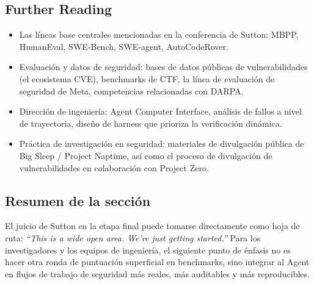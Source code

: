 \documentclass[a4paper]{article}
\begin{document}
\subsection{Further Reading}
\begin{itemize}
    \item Las líneas base centrales mencionadas en la conferencia de Sutton: MBPP, HumanEval, SWE-Bench, SWE-agent, AutoCodeRover.
    \item Evaluación y datos de seguridad: bases de datos públicas de vulnerabilidades (el ecosistema CVE), benchmarks de CTF, la línea de evaluación de seguridad de Meta, competencias relacionadas con DARPA.
    \item Dirección de ingeniería: Agent Computer Interface, análisis de fallos a nivel de trayectoria, diseño de harness que prioriza la verificación dinámica.
    \item Práctica de investigación en seguridad: materiales de divulgación pública de Big Sleep / Project Naptime, así como el proceso de divulgación de vulnerabilidades en colaboración con Project Zero.
\end{itemize}

\subsection{Resumen de la sección}
El juicio de Sutton en la etapa final puede tomarse directamente como hoja de ruta: \textit{``This is a wide open area. We're just getting started.''} Para los investigadores y los equipos de ingeniería, el siguiente punto de énfasis no es hacer otra ronda de puntuación superficial en benchmarks, sino integrar al Agent en flujos de trabajo de seguridad más reales, más auditables y más reproducibles.
\end{document}
